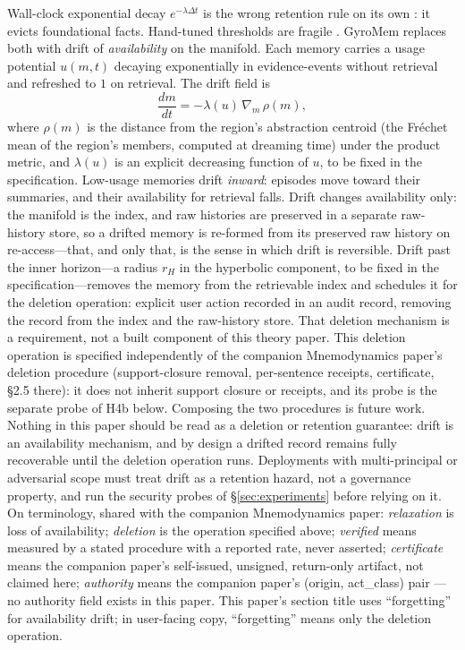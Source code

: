 \documentclass[11pt,a4paper]{article}
\begin{document}
Wall-clock exponential decay $e^{-\lambda \Delta t}$ is the wrong
retention rule on its own \cite{engramrag}: it evicts foundational facts.
Hand-tuned thresholds are fragile \cite{epistemics}. GyroMem replaces both
with drift of \emph{availability} on the manifold. Each memory carries a
usage potential $u(m,t)$ decaying exponentially in evidence-events
without retrieval and refreshed to $1$ on retrieval. The drift field is
\begin{equation}
\frac{dm}{dt} = -\lambda(u)\,\nabla_m\, \rho(m),
\end{equation}
where $\rho(m)$ is the distance from the region's abstraction centroid
(the Fr\'echet mean of the region's members, computed at dreaming time)
under the product metric, and $\lambda(u)$ is an explicit decreasing
function of $u$, to be fixed in the specification. Low-usage memories drift
\emph{inward}: episodes move toward their summaries, and their
availability for retrieval falls. Drift changes availability only: the
manifold is the index, and raw histories are preserved in a separate
raw-history store, so a drifted memory is re-formed from its preserved
raw history on re-access---that, and only that, is the sense in which
drift is reversible. Drift past the inner horizon---a radius $r_H$ in the
hyperbolic component, to be fixed in the specification---removes the memory
from the retrievable index and schedules it for the deletion operation:
explicit user action recorded in an audit record, removing the record
from the index and the raw-history store. That deletion mechanism is a
requirement, not a built component of this theory paper. This deletion
operation is specified independently of the companion Mnemodynamics
paper's deletion procedure (support-closure removal, per-sentence
receipts, certificate, \S2.5 there): it does not inherit support closure
or receipts, and its probe is the separate probe of H4b below. Composing
the two procedures is future work. Nothing in this
paper should be read as a deletion or retention guarantee: drift is an
availability mechanism, and by design a drifted record remains fully
recoverable until the deletion operation runs. Deployments with
multi-principal or adversarial scope must treat drift as a retention
hazard, not a governance property, and run the security probes of
\S\ref{sec:experiments} before relying on it. On terminology, shared with
the companion Mnemodynamics paper: \emph{relaxation} is loss of
availability; \emph{deletion} is the operation specified above;
\emph{verified} means measured by a stated procedure with a reported
rate, never asserted; \emph{certificate} means the companion paper's
self-issued, unsigned, return-only artifact, not claimed here;
\emph{authority} means the companion paper's (origin, act\_class) pair
---no authority field exists in this paper. This paper's section title uses ``forgetting'' for
availability drift; in user-facing copy, ``forgetting'' means only the
deletion operation.
\end{document}
